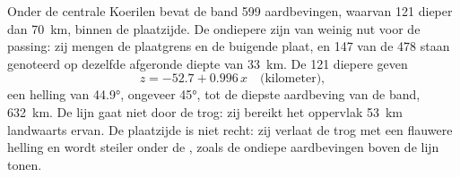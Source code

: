 Onder de centrale Koerilen bevat de band 599 aardbevingen, waarvan 121 dieper dan \qty{70}{km}, binnen de plaatzijde. De ondiepere zijn van weinig nut voor de passing: zij mengen de plaatgrens en de buigende plaat, en 147 van de 478 staan genoteerd op dezelfde afgeronde diepte van \qty{33}{km}. De 121 diepere geven
\[
  z = -52.7 + 0.996\,x \quad\text{(kilometer)},
\]
een helling van \ang{44.9}, ongeveer \ang{45}, tot de diepste aardbeving van de band, \qty{632}{km}. De lijn gaat niet door de trog: zij bereikt het oppervlak \qty{53}{km} landwaarts ervan. De plaatzijde is niet recht: zij verlaat de trog met een flauwere helling en wordt steiler onder de , zoals de ondiepe aardbevingen boven de lijn tonen.

